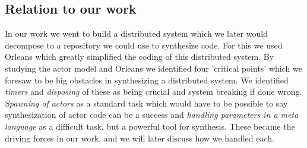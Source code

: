 \subsection{Relation to our work} \label{AMRelation}
In our work we went to build a distributed system which we later would decompose to a repository we could use to synthesize code. For this we used Orleans which greatly simplified the coding of this distributed system. By studying the actor model and Orleans we identified four 'critical points' which we foresaw to be big obstacles in synthesizing a distributed system. We identified \textit{timers} and \textit{disposing} of these as being crucial and system breaking if done wrong. \textit{Spawning of actors} as a standard task which would have to be possible to say synthesization of actor code can be a success and \textit{handling parameters in a meta language} as a difficult task, but a powerful tool for synthesis. These became the driving forces in our work, and we will later discuss how we handled each.